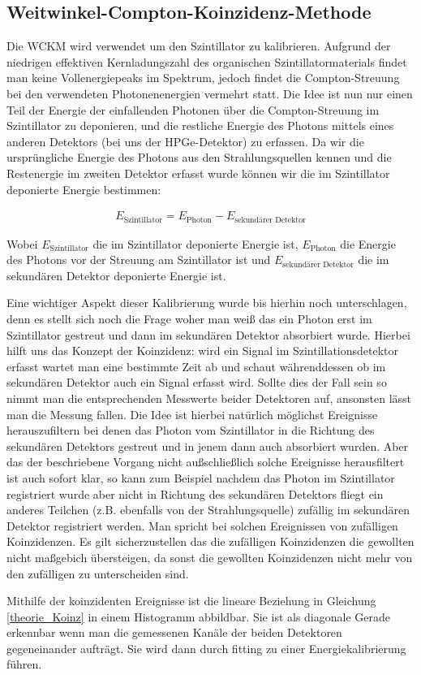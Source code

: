 \subsection{Weitwinkel-Compton-Koinzidenz-Methode}

Die WCKM wird verwendet um den Szintillator zu kalibrieren. Aufgrund der niedrigen effektiven Kernladungszahl des organischen Szintillatormaterials findet man keine Vollenergiepeaks im Spektrum, jedoch findet die Compton-Streuung bei den verwendeten Photonenenergien vermehrt statt. Die Idee ist nun nur einen Teil der Energie der einfallenden Photonen über die Compton-Streuung im Szintillator zu deponieren, und die restliche Energie des Photons mittels eines anderen Detektors (bei uns der HPGe-Detektor) zu erfassen. Da wir die ursprüngliche Energie des Photons aus den Strahlungsquellen kennen und die Restenergie im zweiten Detektor erfasst wurde können wir die im Szintillator deponierte Energie bestimmen:

\begin{gather}
    E_{\text{Szintillator}} = E_{\text{Photon}} - E_{\text{sekundärer Detektor}}
    \label{theorie_Koinz}
\end{gather}

Wobei $E_{\text{Szintillator}}$ die im Szintillator deponierte Energie ist, $E_{\text{Photon}}$ die Energie des Photons vor der Streuung am Szintillator ist und $E_{\text{sekundärer Detektor}}$ die im sekundären Detektor deponierte Energie ist.

Eine wichtiger Aspekt dieser Kalibrierung wurde bis hierhin noch unterschlagen, denn es stellt sich noch die Frage woher man weiß das ein Photon erst im Szintillator gestreut und dann im sekundären Detektor absorbiert wurde. Hierbei hilft uns das Konzept der Koinzidenz: wird ein Signal im Szintillationsdetektor erfasst wartet man eine bestimmte Zeit ab und schaut währenddessen ob im sekundären Detektor auch ein Signal erfasst wird. Sollte dies der Fall sein so nimmt man die entsprechenden Messwerte beider Detektoren auf, ansonsten lässt man die Messung fallen. Die Idee ist hierbei natürlich möglichst Ereignisse herauszufiltern bei denen das Photon vom Szintillator in die Richtung des sekundären Detektors gestreut und in jenem dann auch absorbiert wurden. Aber das der beschriebene Vorgang nicht außschließlich solche Ereignisse herausfiltert ist auch sofort klar, so kann zum Beispiel nachdem das Photon im Szintillator registriert wurde aber nicht in Richtung des sekundären Detektors fliegt ein anderes Teilchen (z.B. ebenfalls von der Strahlungsquelle) zufällig im sekundären Detektor registriert werden. Man spricht bei solchen Ereignissen von zufälligen Koinzidenzen. Es gilt sicherzustellen das die zufälligen Koinzidenzen die gewollten nicht maßgebich übersteigen, da sonst die gewollten Koinzidenzen nicht mehr von den zufälligen zu unterscheiden sind.

Mithilfe der koinzidenten Ereignisse ist die lineare Beziehung in Gleichung \ref{theorie_Koinz} in einem Histogramm abbildbar. Sie ist als diagonale Gerade erkennbar wenn man die gemessenen Kanäle der beiden Detektoren gegeneinander aufträgt. Sie wird dann durch fitting zu einer Energiekalibrierung führen.
